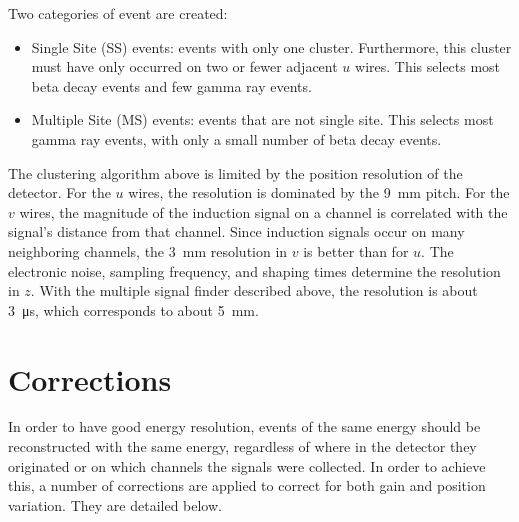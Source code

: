 \documentclass[herrin-thesis.tex]{subfiles}
\begin{document}
Two categories of event are created:
\begin{itemize}
\item Single Site (SS) events: events with only one cluster. Furthermore, this cluster must have only occurred on two or fewer adjacent \(u\) wires. This selects most beta decay events and few gamma ray events.
\item Multiple Site (MS) events: events that are not single site. This selects most gamma ray events, with only a small number of beta decay events.
\end{itemize}

The clustering algorithm above is limited by the position resolution of the detector. For the \(u\) wires, the resolution is dominated by the \SI{9}{\mm} pitch. For the \(v\) wires, the magnitude of the induction signal on a channel is correlated with the signal's distance from that channel. Since induction signals occur on many neighboring channels, the \SI{3}{\mm} resolution in \(v\) is better than for \(u\). The electronic noise, sampling frequency, and shaping times determine the resolution in \(z\). With the multiple signal finder described above, the resolution is about \SI{3}{\micro\s}, which corresponds to about \SI{5}{\mm}.

\section{Corrections}
\label{sec:data_corrections}
In order to have good energy resolution, events of the same energy should be reconstructed with the same energy, regardless of where in the detector they originated or on which channels the signals were collected. In order to achieve this, a number of corrections are applied to correct for both gain and position variation. They are detailed below.
\end{document}

